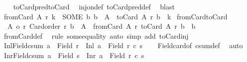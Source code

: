 \begin{isabellebody}
%
\isadelimproof
\ \ %
\endisadelimproof
%
\isatagproof
{}\isamarkupfalse%
\ toCard{\isacharunderscore}{\kern0pt}pred{\isacharunderscore}{\kern0pt}toCard\ \isamarkupfalse%
\ inj{\isacharunderscore}{\kern0pt}on{\isacharunderscore}{\kern0pt}def\ toCard{\isacharunderscore}{\kern0pt}pred{\isacharunderscore}{\kern0pt}def\ \isamarkupfalse%
\ blast%
\endisatagproof
{\isafoldproof}%
%
\isadelimproof
\isanewline
%
\endisadelimproof
\isanewline
{}\isamarkupfalse%
\ {\isachardoublequoteopen}fromCard\ A\ r\ k\ {\isasymequiv}\ SOME\ b{\isachardot}{\kern0pt}\ b\ {\isasymin}\ A\ {\isasymand}\ toCard\ A\ r\ b\ {\isacharequal}{\kern0pt}\ k{\isachardoublequoteclose}\isanewline
\isanewline
{}\isamarkupfalse%
\ fromCard{\isacharunderscore}{\kern0pt}toCard{\isacharcolon}{\kern0pt}\isanewline
\ \ {\isachardoublequoteopen}{\isasymlbrakk}{\isacharbar}{\kern0pt}A{\isacharbar}{\kern0pt}\ {\isasymle}o\ r{\isacharsemicolon}{\kern0pt}\ Card{\isacharunderscore}{\kern0pt}order\ r{\isacharsemicolon}{\kern0pt}\ b\ {\isasymin}\ A{\isasymrbrakk}\ {\isasymLongrightarrow}\ fromCard\ A\ r\ {\isacharparenleft}{\kern0pt}toCard\ A\ r\ b{\isacharparenright}{\kern0pt}\ {\isacharequal}{\kern0pt}\ b{\isachardoublequoteclose}\isanewline
%
\isadelimproof
\ \ %
\endisadelimproof
%
\isatagproof
{}\isamarkupfalse%
\ fromCard{\isacharunderscore}{\kern0pt}def\ \isamarkupfalse%
\ {\isacharparenleft}{\kern0pt}rule\ some{\isacharunderscore}{\kern0pt}equality{\isacharparenright}{\kern0pt}\ {\isacharparenleft}{\kern0pt}auto\ simp\ add{\isacharcolon}{\kern0pt}\ toCard{\isacharunderscore}{\kern0pt}inj{\isacharparenright}{\kern0pt}%
\endisatagproof
{\isafoldproof}%
%
\isadelimproof
\isanewline
%
\endisadelimproof
\isanewline
{}\isamarkupfalse%
\ Inl{\isacharunderscore}{\kern0pt}Field{\isacharunderscore}{\kern0pt}csum{\isacharcolon}{\kern0pt}\ {\isachardoublequoteopen}a\ {\isasymin}\ Field\ r\ {\isasymLongrightarrow}\ Inl\ a\ {\isasymin}\ Field\ {\isacharparenleft}{\kern0pt}r\ {\isacharplus}{\kern0pt}c\ s{\isacharparenright}{\kern0pt}{\isachardoublequoteclose}\isanewline
%
\isadelimproof
\ \ %
\endisadelimproof
%
\isatagproof
{}\isamarkupfalse%
\ Field{\isacharunderscore}{\kern0pt}card{\isacharunderscore}{\kern0pt}of\ csum{\isacharunderscore}{\kern0pt}def\ \isamarkupfalse%
\ auto%
\endisatagproof
{\isafoldproof}%
%
\isadelimproof
\isanewline
%
\endisadelimproof
\isanewline
{}\isamarkupfalse%
\ Inr{\isacharunderscore}{\kern0pt}Field{\isacharunderscore}{\kern0pt}csum{\isacharcolon}{\kern0pt}\ {\isachardoublequoteopen}a\ {\isasymin}\ Field\ s\ {\isasymLongrightarrow}\ Inr\ a\ {\isasymin}\ Field\ {\isacharparenleft}{\kern0pt}r\ {\isacharplus}{\kern0pt}c\ s{\isacharparenright}{\kern0pt}{\isachardoublequoteclose}\isanewline

\end{isabellebody}
